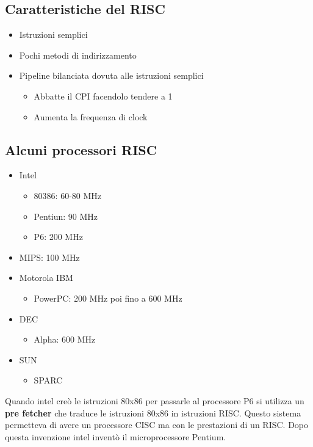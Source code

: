\documentclass[a4paper]{article}
\theoremstyle{break}
\theoremstyle{break}
\theoremstyle{break}
\theoremstyle{break}
\begin{document}
\subsection{Caratteristiche del RISC}
\begin{itemize}
  \item Istruzioni semplici
  \item Pochi metodi di indirizzamento
  \item Pipeline bilanciata dovuta alle istruzioni semplici
    \begin{itemize}
      \item Abbatte il CPI facendolo tendere a 1
      \item Aumenta la frequenza di clock
    \end{itemize}
\end{itemize}

\subsection{Alcuni processori RISC}
\begin{itemize}
  \item Intel
    \begin{itemize}
      \item 80386: 60-80 MHz
      \item Pentiun: 90 MHz
      \item P6: 200 MHz
    \end{itemize}
  \item MIPS: 100 MHz
  \item Motorola IBM
    \begin{itemize}
      \item PowerPC: 200 MHz poi fino a 600 MHz
    \end{itemize}
  \item DEC
    \begin{itemize}
      \item Alpha: 600 MHz
    \end{itemize}
  \item SUN
    \begin{itemize}
      \item SPARC
    \end{itemize}
\end{itemize}

\noindent Quando intel creò le istruzioni 80x86 per passarle al processore P6 si utilizza
un \textbf{pre fetcher} che traduce le istruzioni 80x86 in istruzioni RISC.
Questo sistema permetteva di avere un processore CISC ma con le prestazioni di
un RISC. Dopo questa invenzione intel inventò il microprocessore Pentium.
\end{document}
